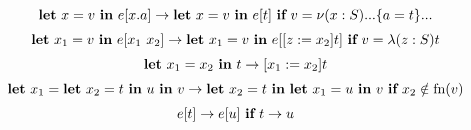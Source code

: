 \[\begin{array}{c}
    \textbf{let}\ x = v\ \textbf{in}\ e[x.a] \rightarrow \textbf{let}\ x = v\ \textbf{in}\ e[t]
        \ \textbf{if}\  v = \nu(x:S)...\{a = t\}... \\[2mm]
    \textbf{let}\ x_1 = v\ \textbf{in}\ e[x_1\ x_2] \rightarrow \textbf{let}\ x_1 = v\ \textbf{in}\ e[[z := x_2]t]
        \ \textbf{if}\  v = \lambda(z:S)t \\[2mm]
    \textbf{let}\ x_1 = x_2\ \textbf{in}\ t \rightarrow [x_1 := x_2]{t} \\[2mm]
    \textbf{let}\ x_1 = \textbf{let}\ x_2 = t\ \textbf{in}\ u\ \textbf{in}\ v \rightarrow \textbf{let}\ x_2 = t\ \textbf{in}\ \textbf{let}\ x_1 = u\ \textbf{in}\ v
        \ \textbf{if}\  x_2 \notin \text{fn}(v) \\[2mm]
    e[t] \rightarrow e[u] \ \textbf{if}\  t \rightarrow u
\end{array}\]
